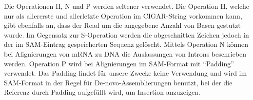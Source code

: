 Die Operationen H, N und P werden seltener verwendet.
Die Operation H, welche nur als allererste und allerletzte Operation im CIGAR-String vorkommen kann, gibt ebenfalls an, dass der Read um die angegebene Anzahl von Basen gestutzt wurde. Im Gegensatz zur S-Operation werden die abgeschnitten Zeichen jedoch in der im SAM-Eintrag gespeicherten Sequenz gelöscht.
Mittels Operation N können bei Alignierungen von mRNA zu DNA die Auslassungen von Introns beschrieben werden.
Operation P wird bei Alignierungen im SAM-Format mit "`Padding"' verwendet.
Das Padding findet für unsere Zwecke keine Verwendung und wird im SAM-Format in der Regel für De-novo-Assemblierungen benutzt, bei der die Referenz durch Padding aufgefüllt wird, um Insertion anzuzeigen.
